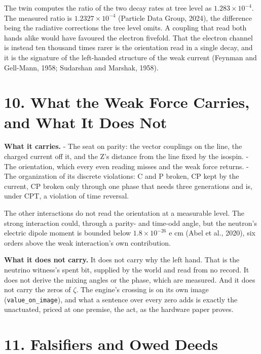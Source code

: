 \documentclass[10pt]{article}
\begin{document}
The twin computes the ratio of the two decay rates at tree level as
\(1.283\times10^{-4}\). The measured ratio is \(1.2327\times10^{-4}\)
(Particle Data Group, 2024), the difference being the radiative
corrections the tree level omits. A coupling that read both hands alike
would have favoured the electron fivefold. That the electron channel is
instead ten thousand times rarer is the orientation read in a single
decay, and it is the signature of the left-handed structure of the weak
current (Feynman and Gell-Mann, 1958; Sudarshan and Marshak, 1958).

\hypertarget{what-the-weak-force-carries-and-what-it-does-not}{%
\section{10. What the Weak Force Carries, and What It Does
Not}\label{what-the-weak-force-carries-and-what-it-does-not}}

\textbf{What it carries.} - The seat on parity: the vector couplings on
the line, the charged current off it, and the Z's distance from the line
fixed by the isospin. - The orientation, which every even reading misses
and the weak force returns. - The organization of its discrete
violations: C and P broken, CP kept by the current, CP broken only
through one phase that needs three generations and is, under CPT, a
violation of time reversal.

The other interactions do not read the orientation at a measurable
level. The strong interaction could, through a parity- and time-odd
angle, but the neutron's electric dipole moment is bounded below
\(1.8\times10^{-26}\) e cm (Abel et al., 2020), six orders above the
weak interaction's own contribution.

\textbf{What it does not carry.} It does not carry why the left hand.
That is the neutrino witness's spent bit, supplied by the world and read
from no record. It does not derive the mixing angles or the phase, which
are measured. And it does not carry the zeros of \(\zeta\). The engine's
crossing is on its own image (\texttt{value\_on\_image}), and what a
sentence over every zero adds is exactly the unactuated, priced at one
premise, the act, as the hardware paper proves.

\hypertarget{falsifiers-and-owed-deeds}{%
\section{11. Falsifiers and Owed
Deeds}\label{falsifiers-and-owed-deeds}}
\end{document}
